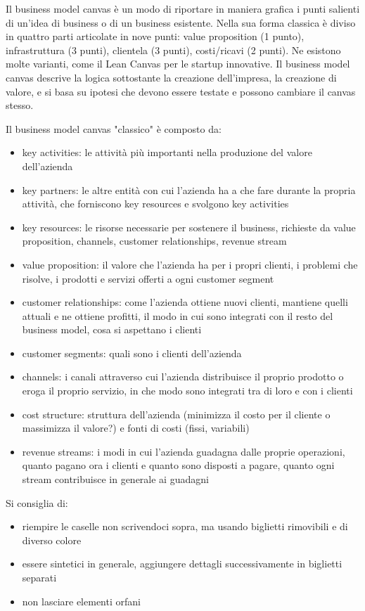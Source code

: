 \documentclass[answers, a4paper, 11pt]{exam}
\begin{document}
Il business model canvas è un modo di riportare in maniera grafica i punti salienti di un'idea di business o di un business esistente. Nella sua forma classica è diviso in quattro parti articolate in nove punti: value proposition (1 punto), infrastruttura (3 punti), clientela (3 punti), costi/ricavi (2 punti). Ne esistono molte varianti, come il Lean Canvas per le startup innovative. 
Il business model canvas descrive  la logica sottostante la creazione dell'impresa, la creazione di valore, e si basa su ipotesi che devono essere testate e possono cambiare il canvas stesso.

Il business model canvas "classico" è composto da:

\begin{itemize}
    \item key activities: le attività più importanti nella produzione del valore dell'azienda
    \item key partners: le altre entità con cui l'azienda ha a che fare durante la propria attività, che forniscono key resources e svolgono key activities
    \item key resources: le risorse necessarie per sostenere il business, richieste da value proposition, channels, customer relationships, revenue stream
    \item value proposition: il valore che l'azienda ha per i propri clienti, i problemi che risolve, i prodotti e servizi offerti a ogni customer segment
    \item customer relationships: come l'azienda ottiene nuovi clienti, mantiene quelli attuali e ne ottiene profitti, il modo in cui sono integrati con il resto del business model, cosa si aspettano  i clienti
    \item customer segments: quali sono i clienti dell'azienda
    \item channels: i canali attraverso cui l'azienda distribuisce il proprio prodotto o eroga il proprio servizio, in che modo sono integrati tra di loro e con i clienti
    \item cost structure: struttura dell'azienda (minimizza il costo per il cliente o massimizza il valore?) e fonti di costi (fissi, variabili)
    \item revenue streams: i modi in cui l'azienda guadagna dalle proprie operazioni, quanto pagano ora i clienti e quanto sono disposti a pagare, quanto ogni stream contribuisce in generale ai guadagni
\end{itemize}

Si consiglia di:
\begin{itemize}
    \item riempire le caselle non scrivendoci sopra, ma usando biglietti rimovibili e di diverso colore
    \item essere sintetici in generale, aggiungere dettagli successivamente in biglietti separati
    \item non lasciare elementi orfani
\end{itemize} 
\end{document}
